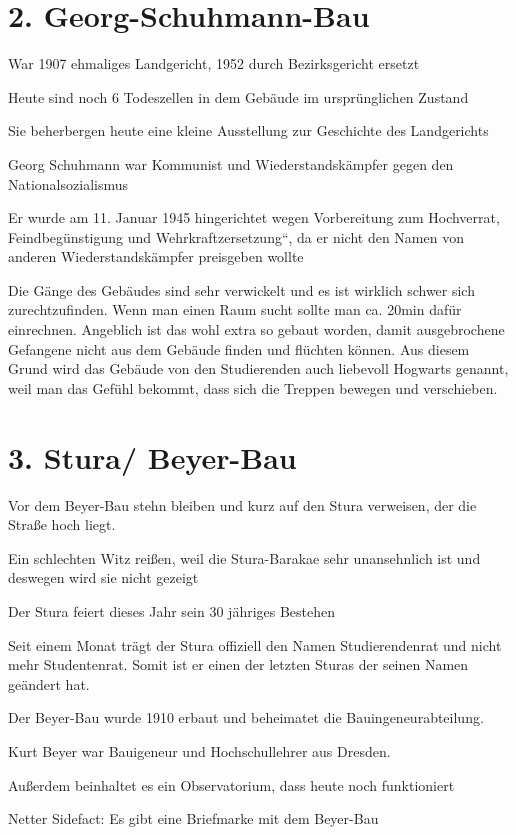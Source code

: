 \documentclass[a4paper,12pt]{report}
\begin{document}
\section{2. Georg-Schuhmann-Bau}
\begin{itemize*}
\item War 1907 ehmaliges Landgericht, 1952 durch Bezirksgericht ersetzt
\item Heute sind noch 6 Todeszellen in dem Gebäude im ursprünglichen Zustand
\item Sie beherbergen heute eine kleine Ausstellung zur Geschichte des Landgerichts
\item Georg Schuhmann war Kommunist und Wiederstandskämpfer gegen den Nationalsozialismus
\item Er wurde am 11. Januar 1945 hingerichtet wegen Vorbereitung zum Hochverrat, Feindbegünstigung und Wehrkraftzersetzung“, da er nicht den Namen von anderen Wiederstandskämpfer preisgeben wollte
\item 
\item Die Gänge des Gebäudes sind sehr verwickelt und es ist wirklich schwer sich zurechtzufinden. Wenn man einen Raum sucht sollte man ca. 20min dafür einrechnen. Angeblich ist das wohl extra so gebaut worden, damit ausgebrochene Gefangene nicht aus dem Gebäude finden und flüchten können. Aus diesem Grund wird das Gebäude von den Studierenden auch liebevoll Hogwarts genannt, weil man das Gefühl bekommt, dass sich die Treppen bewegen und verschieben.
\end{itemize*}


\section{3. Stura/ Beyer-Bau}
\begin{itemize*}
	\item Vor dem Beyer-Bau stehn bleiben und kurz auf den Stura verweisen, der die Straße hoch liegt.
	\item Ein schlechten Witz reißen, weil die Stura-Barakae sehr unansehnlich ist und deswegen wird sie nicht gezeigt
	\item Der Stura feiert dieses Jahr sein 30 jähriges Bestehen
	\item Seit einem Monat trägt der Stura offiziell den Namen Studierendenrat und nicht mehr Studentenrat. Somit ist er einen der letzten Sturas der seinen Namen geändert hat.
	
	\item 
	\item Der Beyer-Bau wurde 1910 erbaut und beheimatet die Bauingeneurabteilung.
	\item Kurt Beyer war Bauigeneur und Hochschullehrer aus Dresden. 
	\item Außerdem beinhaltet es ein Observatorium, dass heute noch funktioniert
	\item Netter Sidefact: Es gibt eine Briefmarke mit dem Beyer-Bau
\end{itemize*}
\end{document}
